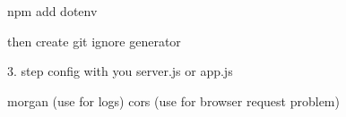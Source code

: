 npm add dotenv

then create git ignore generator

3. step config with you server.js or app.js

morgan (use for logs)
cors (use for browser request problem)